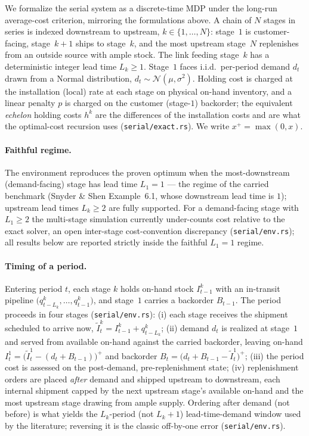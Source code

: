 We formalize the serial system as a discrete-time MDP under the long-run average-cost criterion,
mirroring the formulations above. A chain of $N$ stages in series is indexed downstream to upstream,
$k\in\{1,\dots,N\}$: stage~$1$ is customer-facing, stage~$k{+}1$ ships to stage~$k$, and the most
upstream stage~$N$ replenishes from an outside source with ample stock. The link feeding stage~$k$ has
a deterministic integer lead time $L_k\ge 1$. Stage~$1$ faces i.i.d.\ per-period demand $d_t$ drawn
from a Normal distribution, $d_t\sim\mathcal N(\mu,\sigma^2)$. Holding cost is charged at the
installation (local) rate at each stage on physical on-hand inventory, and a linear penalty $p$ is
charged on the customer (stage-$1$) backorder; the equivalent \emph{echelon} holding costs $h^k$ are
the differences of the installation costs and are what the optimal-cost recursion uses
(\texttt{serial/exact.rs}). We write $x^+=\max(0,x)$.

\paragraph{Faithful regime.}
The environment reproduces the proven optimum when the most-downstream (demand-facing) stage has lead
time $L_1=1$ --- the regime of the carried benchmark (Snyder \& Shen Example~6.1, whose downstream
lead time is $1$); upstream lead times $L_k\ge 2$ are fully supported. For a demand-facing stage with
$L_1\ge 2$ the multi-stage simulation currently under-counts cost relative to the exact solver, an
open inter-stage cost-convention discrepancy (\texttt{serial/env.rs}); all results below are reported
strictly inside the faithful $L_1=1$ regime.

\paragraph{Timing of a period.}
Entering period $t$, each stage $k$ holds on-hand stock $I^k_{t-1}$ with an in-transit pipeline
$\big(q^k_{t-L_k},\dots,q^k_{t-1}\big)$, and stage~$1$ carries a backorder $B_{t-1}$. The period
proceeds in four stages (\texttt{serial/env.rs}): (i) each stage receives the shipment scheduled to
arrive now, $\widetilde I^k_t = I^k_{t-1}+q^k_{t-L_k}$; (ii) demand $d_t$ is realized at stage~$1$ and
served from available on-hand against the carried backorder, leaving on-hand
$I^1_t=\big(\widetilde I^1_t-(d_t+B_{t-1})\big)^+$ and backorder
$B_t=\big(d_t+B_{t-1}-\widetilde I^1_t\big)^+$; (iii) the period cost is assessed on the post-demand,
pre-replenishment state; (iv) replenishment orders are placed \emph{after} demand and shipped upstream
to downstream, each internal shipment capped by the next upstream stage's available on-hand and the
most upstream stage drawing from ample supply. Ordering after demand (not before) is what yields the
$L_k$-period (not $L_k{+}1$) lead-time-demand window used by the literature; reversing it is the
classic off-by-one error (\texttt{serial/env.rs}).

